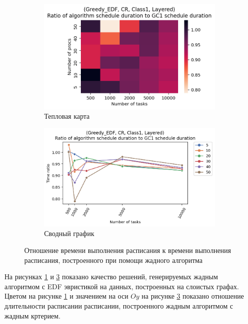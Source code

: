 \begin{figure}[!htbp]
    \centering
    \begin{subfigure}{0.49\textwidth}
        \includegraphics[width=\textwidth]{imgs/layered_class_1/CR_EDF/times.png}
        \caption{Тепловая карта}
        \label{fig:CR-layered-EDF-times-heatmap}
    \end{subfigure}
    \hfill
    \begin{subfigure}{0.49\textwidth}
        \includegraphics[width=\textwidth]{imgs/layered_class_1/CR_EDF/gr_amalgamated.png}
        \caption{Сводный график}
        \label{fig:CR-layered-EDF-times-compiled} 
    \end{subfigure}
    \caption{Отношение времени выполнения расписания к времени выполнения расписания, построенного при помощи жадного алгоритма}
\end{figure}

На рисунках \ref{fig:CR-layered-EDF-times-heatmap} и \ref{fig:CR-layered-EDF-times-compiled} показано качество решений, генерируемых жадным алгоритмом с EDF эвристикой на данных, построенных на слоистых графах. Цветом на рисунке \ref{fig:CR-layered-EDF-times-heatmap} и значением на оси $Oy$ на рисунке \ref{fig:CR-layered-EDF-times-compiled} показано отношение длительности расписании расписании, построенного жадным алгоритмом с жадным кртерием.

